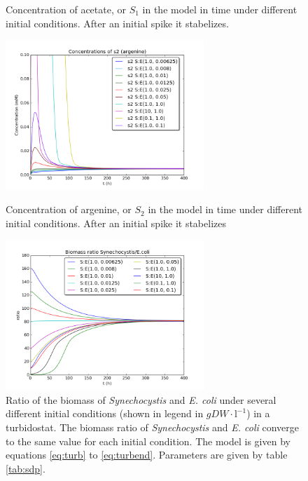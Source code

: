 \documentclass[10pt]{report}
\begin{document}
\begin{figure}[htbp]
\begin{minipage}{.45\textwidth}
\begin{center}
     \caption{Concentration of acetate, or $S_1$ in the model in time under different initial conditions. After an initial spike it stabelizes.}
    \label{fig:s1}
   \end{center}
  \end{minipage}
    \hfill
  \begin{minipage}{.45\textwidth}
   \begin{center}
         \includegraphics[width=7.5cm]{S2.png}
     \caption{Concentration of argenine, or $S_2$ in the model in time under different initial conditions. After an initial spike it stabelizes}
    \label{fig:s2}
   \end{center}
  \end{minipage}
    \hfill
  \begin{minipage}{.45\textwidth}
   \begin{center}
     \includegraphics[width=7.5cm]{sub_dependent_turbidostat_bratio.png}
     \caption{Ratio of the biomass of \textit{Synechocystis} and \textit{E. coli} under several different initial conditions (shown in legend in $gDW\cdot \text{l}^{-1}$) in a turbidostat. The biomass ratio of \textit{Synechocystis} and \textit{E. coli} converge to the same value for each initial condition. The model is given by equations \ref{eq:turb} to \ref{eq:turbend}. Parameters are given by table \ref{tab:sdp}.}
     \label{fig:subratturb}
   \end{center}
  \end{minipage}

\end{figure}
\end{document}

